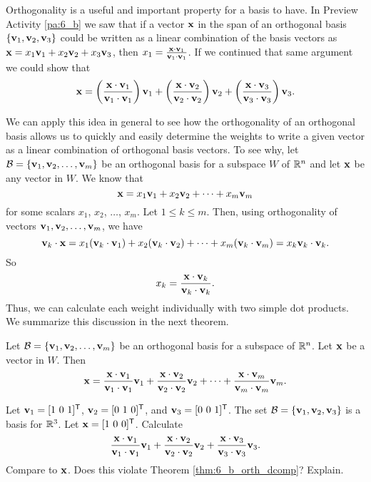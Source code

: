 \label{sec:orthog_bases_prop}

Orthogonality is a useful and important property for a basis to have. In Preview Activity \ref{pa:6_b} we saw that if a vector $\mathbf{x}$ in the span of an orthogonal basis $\{\mathbf{v}_1, \mathbf{v}_2, \mathbf{v}_3\}$ could be written as a linear combination of the basis vectors as $\mathbf{x} = x_1 \mathbf{v}_1 + x_2 \mathbf{v}_2 + x_3 \mathbf{v}_3$, then $x_1 = \frac{\mathbf{x} \cdot \mathbf{v}_1}{\mathbf{v}_1 \cdot \mathbf{v}_1}$. If we continued that same argument we could show that 
\[\mathbf{x} = \left(\frac{\mathbf{x} \cdot \mathbf{v}_1}{\mathbf{v}_1 \cdot \mathbf{v}_1}\right) \mathbf{v}_1 + \left(\frac{\mathbf{x} \cdot \mathbf{v}_2}{\mathbf{v}_2 \cdot \mathbf{v}_2}\right) \mathbf{v}_2 + \left(\frac{\mathbf{x} \cdot \mathbf{v}_3}{\mathbf{v}_3 \cdot \mathbf{v}_3}\right) \mathbf{v}_3.\]

We can apply this idea in general to see how the orthogonality of an orthogonal basis allows us to quickly and easily determine the weights to write a given vector as a linear combination of orthogonal basis vectors. To see why, let $\mathcal{B} = \{\mathbf{v}_1, \mathbf{v}_2, \ldots, \mathbf{v}_m\}$ be an orthogonal basis for a subspace $W$ of $\mathbb{R}^n$ and let $\mathbf{x}$ be any vector in $W$. We know that
\[\mathbf{x} = x_1\mathbf{v}_1 + x_2\mathbf{v}_2 + \cdots + x_m \mathbf{v}_m\]
for some scalars $x_1$, $x_2$, $\ldots$, $x_m$. Let $1\leq k\leq m$. Then, using orthogonality of vectors $\mathbf{v}_1, \mathbf{v}_2, \ldots, \mathbf{v}_m$, we have
\[\mathbf{v}_k \cdot \mathbf{x} = x_1(\mathbf{v}_k \cdot \mathbf{v}_1) + x_2(\mathbf{v}_k \cdot \mathbf{v}_2) + \cdots + x_m(\mathbf{v}_k \cdot \mathbf{v}_m) = x_k \mathbf{v}_k \cdot \mathbf{v}_k.\]
So
\[x_k = \displaystyle \frac{\mathbf{x} \cdot \mathbf{v}_k}{\mathbf{v}_k \cdot \mathbf{v}_k}.\]
Thus, we can calculate each weight individually with two simple dot products. We summarize this discussion in the next theorem.

\begin{theorem} \label{thm:6_b_orth_dcomp} Let $\mathcal{B} = \{\mathbf{v}_1, \mathbf{v}_2, \ldots, \mathbf{v}_m\}$ be an orthogonal basis for a subspace of $\mathbb{R}^n$. Let $\mathbf{x}$ be a vector in $W$. Then
\begin{equation}
\mathbf{x} = \displaystyle \frac{\mathbf{x} \cdot \mathbf{v}_1}{\mathbf{v}_1 \cdot \mathbf{v}_1} \mathbf{v}_1 +  \frac{\mathbf{x} \cdot \mathbf{v}_2}{\mathbf{v}_2 \cdot \mathbf{v}_2} \mathbf{v}_2 + \cdots + \frac{\mathbf{x} \cdot \mathbf{v}_m}{\mathbf{v}_m \cdot \mathbf{v}_m} \mathbf{v}_m. \label{eq:6_b_orth_ddecomp}
\end{equation}
\end{theorem}


\begin{activity} Let $\mathbf{v}_1 = [1 \ 0 \ 1]^{\mathsf{T}}$, $\mathbf{v}_2 = [0 \ 1 \ 0]^{\mathsf{T}}$, and $\mathbf{v}_3 = [0 \ 0 \ 1]^{\mathsf{T}}$. The set $\mathcal{B} = \{\mathbf{v}_1, \mathbf{v}_2, \mathbf{v}_3\}$ is a basis for $\mathbb{R}^3$. Let $\mathbf{x} = [1 \ 0 \ 0]^{\mathsf{T}}$. Calculate 
\[\frac{\mathbf{x} \cdot \mathbf{v}_1}{\mathbf{v}_1 \cdot \mathbf{v}_1}\mathbf{v}_1 + \frac{\mathbf{x} \cdot \mathbf{v}_2}{\mathbf{v}_2 \cdot \mathbf{v}_2}\mathbf{v}_2 + \frac{\mathbf{x} \cdot \mathbf{v}_3}{\mathbf{v}_3 \cdot \mathbf{v}_3}\mathbf{v}_3.\]
Compare to $\mathbf{x}$. Does this violate Theorem \ref{thm:6_b_orth_dcomp}? Explain.

\end{activity}

